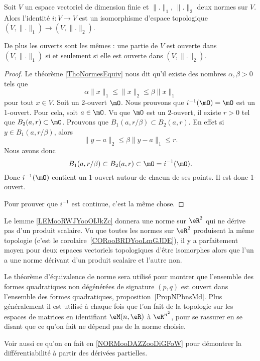 \begin{corollary}       \label{CORooBRDYooLmGJDE}
	Soit \( V\) un espace vectoriel de dimension finie et \( \| . \|_1\), \( \| . \|_2\) deux normes sur \( V\). Alors l'identité \( i\colon V\to V\) est un isomorphisme d'espace topologique \( (V,\| . \|_1)\to (V,\| . \|_2)\).

	De plus les ouverts sont les mêmes : une partie de \( V\) est ouverte dans \( (V,\| . \|_1)\) si et seulement si elle est ouverte dans \( (V,\| . \|_2)\).
\end{corollary}

\begin{proof}
	Le théorème \ref{ThoNormesEquiv} nous dit qu'il existe des nombres \( \alpha,\beta>0\) tels que
	\begin{equation}
		\alpha\| x \|_1\leq \| x \|_2\leq \beta\| x \|_1
	\end{equation}
	pour tout \( x\in V\). Soit un 2-ouvert \( \mO\). Nous prouvons que \( i^{-1}(\mO)=\mO\) est un 1-ouvert. Pour cela, soit \( a\in\mO\).  Vu que \( \mO\) est un \( 2\)-ouvert, il existe \( r>0\) tel que \( B_2(a,r)\subset\mO\). Prouvons que \( B_1(a,r/\beta)\subset B_2(a,r)\). En effet si \( y\in B_1(a,r/\beta)\), alors
	\begin{equation}
		\| y-a \|_2\leq \beta\| y-a \|_1\leq r.
	\end{equation}
	Nous avons donc
	\begin{equation}
		B_1(a,r/\beta)\subset B_2(a,r)\subset\mO=i^{-1}(\mO).
	\end{equation}
	Donc \( i^{-1}(\mO)\) contient un 1-ouvert autour de chacun de ses points. Il est donc 1-ouvert.

	Pour prouver que \( i^{-1}\) est continue, c'est la même chose.
\end{proof}


\begin{normaltext}      \label{NORMooNKBCooKziIjx}
	Le lemme \ref{LEMooRWJYooOIJkZc} donnera une norme sur \( \eR^2\) qui ne dérive pas d'un produit scalaire. Vu que toutes les normes sur \( \eR^2\) produisent la même topologie (c'est le corolaire~\ref{CORooBRDYooLmGJDE}), il y a parfaitement moyen pour deux espaces vectoriels topologiques d'être isomorphes alors que l'un a une norme dérivant d'un produit scalaire et l'autre non.
\end{normaltext}

\begin{normaltext}
	Le théorème d'équivalence de norme sera utilisé pour montrer que l'ensemble des formes quadratiques non dégénérées de signature \( (p,q)\) est ouvert dans l'ensemble des formes quadratiques, proposition~\ref{PropNPbnsMd}. Plus généralement il est utilisé à chaque fois que l'on fait de la topologie sur les espaces de matrices en identifiant \( \eM(n,\eR)\) à \( \eR^{n^2}\), pour se rassurer en se disant que ce qu'on fait ne dépend pas de la norme choisie.

	Voir aussi ce qu'on en fait en \ref{NORMooDAZZooDiGFoW} pour démontrer la différentiabilité à partir des dérivées partielles.
\end{normaltext}

